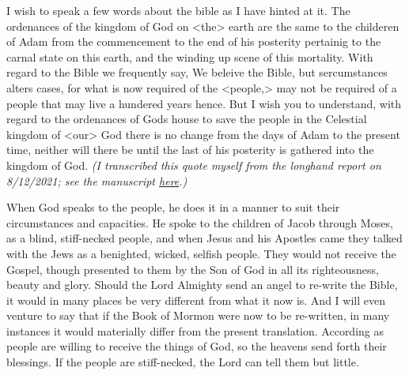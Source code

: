 \begin{compactdesc}
			I wish to speak a few words about the bible as I have hinted at it. The ordenances of the kingdom of God on <the> earth are the same to the childeren of Adam from the commencement to the end of his posterity pertainig to the carnal state on this earth, and the winding up scene of this mortality. With regard to the Bible we frequently say, We beleive the Bible, but sercumstances alters cases, for what is now required of the <people,> may not be required of a people that may live a hundered years hence. But I wish you to understand, with regard to the ordenances of Gods house to save the people in the Celestial kingdom of <our> God there is no change from the days of Adam to the present time, neither will there be until the last of his posterity is gathered into the kingdom of God. \textit{(I transcribed this quote myself from the longhand report on 8/12/2021; see the manuscript \href{https://catalog.churchofjesuschrist.org/assets/65cd9470-c5b4-4922-8e5c-bf0eeb976187/0/0}{here}.)}
			
			\item[13 July 1862, JD 9:311] When God speaks to the people, he does it in a manner to suit their circumstances and capacities. He spoke to the children of Jacob through Moses, as a blind, stiff-necked people, and when Jesus and his Apostles came they talked with the Jews as a benighted, wicked, selfish people. They would not receive the Gospel, though presented to them by the Son of God in all its righteousness, beauty and glory. Should the Lord Almighty send an angel to re-write the Bible, it would in many places be very different from what it now is. And I will even venture to say that if the Book of Mormon were now to be re-written, in many instances it would materially differ from the present translation. According as people are willing to receive the things of God, so the heavens send forth their blessings. If the people are stiff-necked, the Lord can tell them but little.
			

\end{compactdesc}
